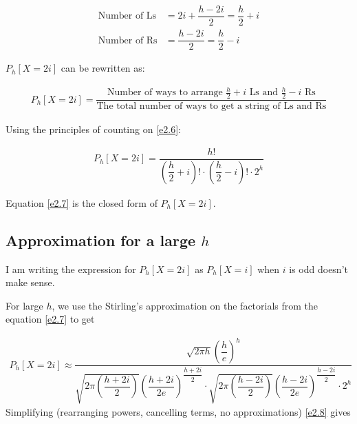 \begin{equation*}
    \begin{aligned}
        \text{Number of Ls} &= 2i + \dfrac{h - 2i}{2} = \dfrac{h}{2} + i \\
        \text{Number of Rs} &= \dfrac{h - 2i}{2} = \dfrac{h}{2} - i
    \end{aligned}
\end{equation*}

$P_h[X = 2i]$ can be rewritten as:

\begin{equation}
    \begin{aligned}
        P_h[X = 2i] = \dfrac{\text{Number of ways to arrange $\frac{h}{2} + i$ Ls
        and $\frac{h}{2} - i$ Rs}}{\text{The total number of ways to get a string
        of Ls and Rs}}
    \end{aligned}
    \label{e2.6}
\end{equation}

Using the principles of counting on \ref{e2.6}:

\begin{equation}
    \begin{aligned}
        P_h[X = 2i] =
        \dfrac{h!}{
        \left(\dfrac{h}{2} + i\right)! \cdot
        \left(\dfrac{h}{2} - i\right)! \cdot
        2^h}
    \end{aligned}
    \label{e2.7}
\end{equation}

Equation \ref{e2.7} is the closed form of $P_h[X = 2i]$.

\subsection*{Approximation for a large $h$}

I am writing the expression for $P_h[X = 2i]$ as $P_h[X = i]$ when $i$ is odd
doesn't make sense.

\vspace{10pt}
\noindent For large $h$, we use the Stirling's approximation on the factorials
from the equation \ref{e2.7} to get

\begin{equation}
    \begin{aligned}
        P_h[X = 2i] \approx
        \dfrac{\sqrt{2\pi h}\left(\dfrac{h}{e}\right)^h}
        {\sqrt{2\pi \left(\dfrac{h + 2i}{2}\right)}
        \left(\dfrac{h + 2i}{2e}\right)^{\dfrac{h + 2i}{2}} \cdot
        \sqrt{2\pi \left(\dfrac{h - 2i}{2}\right)}
        \left(\dfrac{h - 2i}{2e}\right)^{\dfrac{h - 2i}{2}} \cdot
        2^h}
    \end{aligned}
    \label{e2.8}
\end{equation}
Simplifying (rearranging powers, cancelling terms, no approximations) \ref{e2.8}
gives

